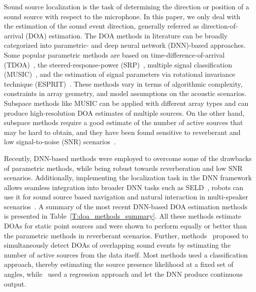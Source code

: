 \documentclass[journal]{IEEEtran}
\begin{document}
Sound source localization is the task of determining the direction or position of a sound source with respect to the microphone. In this paper, we only deal with the estimation of the sound event direction, generally referred as direction-of-arrival (DOA) estimation. The DOA methods in literature can be broadly categorized into parametric- and deep neural network (DNN)-based approaches. Some popular parametric methods are based on time-difference-of-arrival (TDOA)~\cite{Huang2001}, the steered-response-power (SRP)~\cite{Brandstein1997}, multiple signal classification (MUSIC)~\cite{Schmidt1986}, and the estimation of signal parameters via rotational invariance technique (ESPRIT)~\cite{Roy1989}. These methods vary in terms of algorithmic complexity, constraints in array geometry, and model assumptions on the acoustic scenarios. Subspace methods like MUSIC can be applied with different array types and can produce high-resolution DOA estimates of multiple sources. On the other hand, subspace methods require a good estimate of the number of active sources that may be hard to obtain, and they have been found sensitive to reverberant and low signal-to-noise (SNR) scenarios~\cite{dibiase2001robust}. 

Recently, DNN-based methods were employed to overcome some of the drawbacks of parametric methods, while being robust towards reverberation and low SNR scenarios. Additionally, implementing the localization task in the DNN framework allows seamless integration into broader DNN tasks such as SELD~\cite{Hirvonen2015}, robots can use it for sound source based navigation and natural interaction in multi-speaker scenarios~\cite{Takeda2016_single,Takeda2016_double,Yalta2017,He2018}. A summary of the most recent DNN-based DOA estimation methods is presented in Table~\ref{T:doa_methods_summary}. All these methods estimate DOAs for static point sources and were shown to perform equally or better than the parametric methods in reverberant scenarios. Further, methods~\cite{Chakrabarty2017_nips,He2018,Adavanne2018_EUSIPCO,Hirvonen2015} proposed to simultaneously detect DOAs of overlapping sound events by estimating the number of active sources from the data itself. Most methods used a classification approach, thereby estimating the source presence likelihood at a fixed set of angles, while~\cite{Vesperini2016,Ferguson2017} used a regression approach and let the DNN produce continuous output. 
\end{document}
